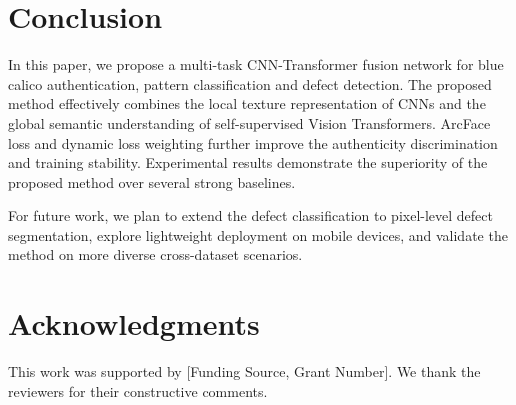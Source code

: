\documentclass[preprint,12pt,a4paper]{elsarticle}
\begin{document}
\section{Conclusion}\label{sec:conclusion}

In this paper, we propose a multi-task CNN-Transformer fusion network for blue calico authentication, pattern classification and defect detection.
The proposed method effectively combines the local texture representation of CNNs and the global semantic understanding of self-supervised Vision Transformers.
ArcFace loss and dynamic loss weighting further improve the authenticity discrimination and training stability.
Experimental results demonstrate the superiority of the proposed method over several strong baselines.

For future work, we plan to extend the defect classification to pixel-level defect segmentation, explore lightweight deployment on mobile devices, and validate the method on more diverse cross-dataset scenarios.

\section*{Acknowledgments}

This work was supported by [Funding Source, Grant Number].
We thank the reviewers for their constructive comments.



\end{document}
